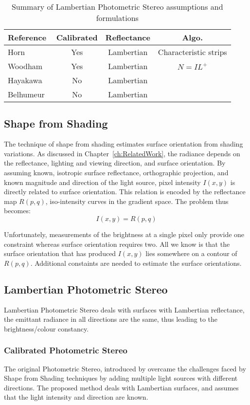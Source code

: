 \begin{table}[h]
  \centering
  \begin{tabular}{l*{3}{c}}
  \hline
  \textbf{Reference} & Calibrated & Reflectance & Algo.\\
  \hline
  Horn~\cite{horn1989shape} & Yes & Lambertian & Characteristic strips\\
  Woodham~\cite{woodham1980photometric} & Yes & Lambertian & $N = IL^{+}$\\
  Hayakawa~\cite{hayakawa1994photometric} & No & Lambertian & \\
  Belhumeur~\cite{belhumeur1999bas} & No & Lambertian & \\
  \hline
  \end{tabular}
  \caption{Summary of Lambertian Photometric Stereo assumptions and formulations}
  \label{tab:class_1}
\end{table}

\subsection{Shape from Shading}
The technique of shape from shading estimates surface orientation from shading variations. As discussed in Chapter~\ref{ch:RelatedWork}, the radiance depends on the reflectance, lighting and viewing direction, and surface orientation. By assuming known, isotropic surface reflectance, orthographic projection, and known magnitude and direction of the light source, pixel intensity $I(x, y)$ is directly related to surface orientation. This relation is encoded by the reflectance map $R(p, q)$, \ie iso-intensity curves in the gradient space. The problem thus becomes:
$$
I(x, y) = R(p, q)
$$

Unfortunately, measurements of the brightness at a single pixel only provide one constraint whereas surface orientation requires two. All we know is that the surface orientation that has produced $I(x, y)$ lies somewhere on a contour of $R(p, q)$. Additional constaints are needed to estimate the surface orientations.

\subsection{Lambertian Photometric Stereo}
Lambertian Photometric Stereo deals with surfaces with Lambertian reflectance, \ie the emittant radiance in all directions are the same, thus leading to the brightness/colour constancy.

\subsubsection{Calibrated Photometric Stereo}
The original Photometric Stereo, introduced by \citeauthor{woodham1980photometric} overcame the challenges faced by Shape from Shading techniques by adding multiple light sources with different directions. The proposed method deals with Lambertian surfaces, and assumes that the light intensity and direction are known.

